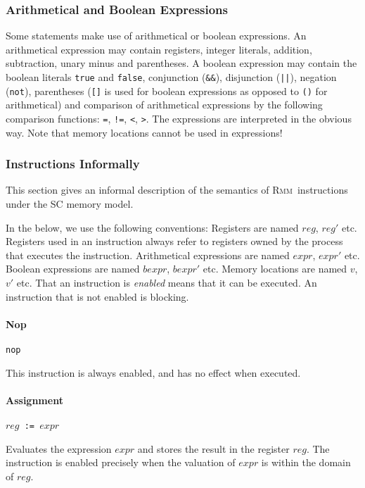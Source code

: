 \documentclass[a4paper]{article}
\newcommand{\rmm}{\textsc{Rmm}}
\begin{document}
\subsubsection{Arithmetical and Boolean Expressions}

Some statements make use of arithmetical or boolean expressions. An
arithmetical expression may contain registers, integer literals,
addition, subtraction, unary minus and parentheses. A boolean
expression may contain the boolean literals \verb+true+ and
\verb+false+, conjunction (\verb+&&+), disjunction (\verb+||+),
negation (\verb+not+), parentheses (\verb+[]+ is used for boolean
expressions as opposed to \verb+()+ for arithmetical) and comparison
of arithmetical expressions by the following comparison functions:
\verb+=+, \verb+!=+, \verb+<+, \verb+>+. The
expressions are interpreted in the obvious way. Note that memory
locations cannot be used in expressions!

\subsubsection{Instructions Informally}

This section gives an informal description of the semantics of \rmm\
instructions under the SC memory model.

In the below, we use the following conventions: Registers are named
$reg$, $reg'$ etc. Registers used in an instruction always refer to
registers owned by the process that executes the
instruction. Arithmetical expressions are named $expr$, $expr'$
etc. Boolean expressions are named $bexpr$, $bexpr'$ etc. Memory
locations are named $v$, $v'$ etc. That an instruction is
\emph{enabled} means that it can be executed. An instruction that is
not enabled is blocking.

\paragraph{Nop} \verb+nop+

This instruction is always enabled, and has no effect when executed.

\paragraph{Assignment} $reg$\verb+ := +$expr$

Evaluates the expression $expr$ and stores the result in the register
$reg$. The instruction is enabled precisely when the valuation of
$expr$ is within the domain of $reg$.
\end{document}
